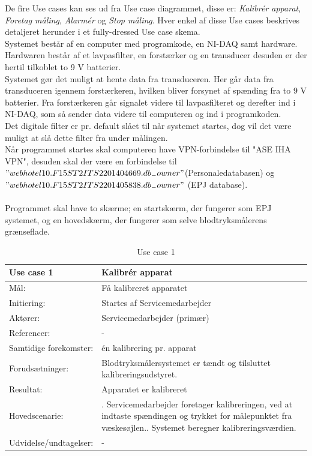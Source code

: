 De fire Use cases kan ses ud fra Use case diagrammet, disse er: \textit{Kalibrér apparat}, \textit{Foretag måling}, \textit{Alarmér} og \textit{Stop måling}. Hver enkel af disse Use cases beskrives detaljeret herunder i et fully-dressed Use case skema.\\
Systemet består af en computer med programkode, en NI-DAQ samt hardware. Hardwaren består af et lavpasfilter, en forstærker og en transducer desuden er der hertil tilkoblet to 9 V batterier.
\\
Systemet gør det muligt at hente data fra transduceren. Her går data fra transduceren igennem forstærkeren, hvilken bliver forsynet af spænding fra to 9 V batterier. Fra forstærkeren går signalet videre til lavpasfilteret og derefter ind i NI-DAQ, som så sender data videre til computeren og ind i programkoden. 
\\ 
Det digitale filter er pr. default slået til når systemet startes, dog vil det være muligt at slå dette filter fra under målingen.\\
Når programmet startes skal computeren have VPN-forbindelse til "ASE IHA VPN", desuden skal der være en forbindelse til $"webhotel10.F15ST2ITS2201404669.db_{-}owner"$(Personaledatabasen) og $"webhotel10.F15ST2ITS2201405838.db_{-}owner"$ (EPJ database).\\\\
Programmet skal have to skærme; en startskærm, der fungerer som EPJ systemet, og en hovedskærm, der fungerer som selve blodtryksmålerens grænseflade.

\begin{table}[H]
\caption{Use case 1}\label{tab:tabel4}
\begin{tabular}{| l | >{\raggedright\arraybackslash}p{11cm} |}
   \hline
   \textbf{Use case 1} & \textbf{Kalibrér apparat}\\ \hline
   Mål: & Få kalibreret apparatet \\ \hline
   Initiering: & Startes af Servicemedarbejder\\ \hline
   Aktører:& Servicemedarbejder (primær)\\ \hline
   Referencer: & - \\ \hline
   Samtidige forekomster: & én kalibrering pr. apparat \\\hline
   Forudsætninger: & Blodtryksmålersystemet er tændt og tilsluttet kalibreringsudstyret.\\ \hline
   Resultat:& Apparatet er kalibreret\\ \hline
   Hovedscenarie:& 
1. Servicemedarbejder foretager kalibreringen, ved at indtaste spændingen og trykket for målepunktet fra væskesøjlen.\newline
2. Systemet beregner kalibreringsværdien.\\\hline
Udvidelse/undtagelser: & - \\\hline
\end{tabular}
\end{table}


